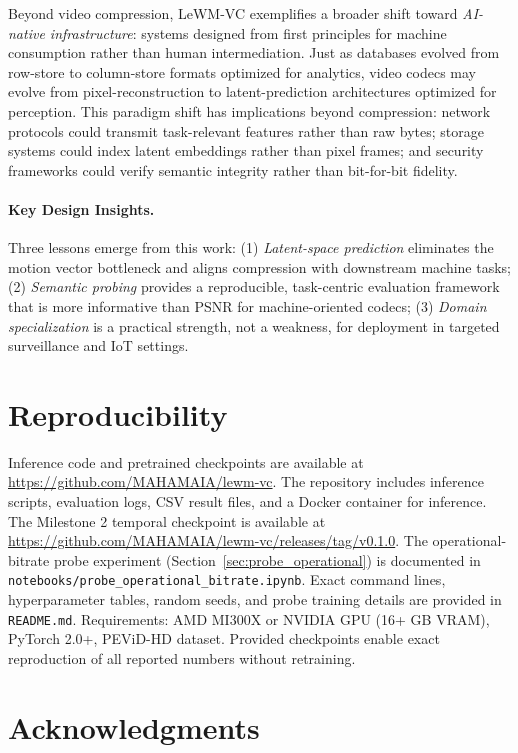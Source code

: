 \documentclass{article}
\begin{document}
Beyond video compression, LeWM-VC exemplifies a broader shift toward \textit{AI-native infrastructure}: systems designed from first principles for machine consumption rather than human intermediation. Just as databases evolved from row-store to column-store formats optimized for analytics, video codecs may evolve from pixel-reconstruction to latent-prediction architectures optimized for perception. This paradigm shift has implications beyond compression: network protocols could transmit task-relevant features rather than raw bytes; storage systems could index latent embeddings rather than pixel frames; and security frameworks could verify semantic integrity rather than bit-for-bit fidelity.

\paragraph{Key Design Insights.} Three lessons emerge from this work: (1) \textit{Latent-space prediction} eliminates the motion vector bottleneck and aligns compression with downstream machine tasks; (2) \textit{Semantic probing} provides a reproducible, task-centric evaluation framework that is more informative than PSNR for machine-oriented codecs; (3) \textit{Domain specialization} is a practical strength, not a weakness, for deployment in targeted surveillance and IoT settings.

\section*{Reproducibility}

Inference code and pretrained checkpoints are available at \url{https://github.com/MAHAMAIA/lewm-vc}. The repository includes inference scripts, evaluation logs, CSV result files, and a Docker container for inference. The Milestone 2 temporal checkpoint is available at \url{https://github.com/MAHAMAIA/lewm-vc/releases/tag/v0.1.0}. The operational-bitrate probe experiment (Section~\ref{sec:probe_operational}) is documented in \texttt{notebooks/probe\_operational\_bitrate.ipynb}. Exact command lines, hyperparameter tables, random seeds, and probe training details are provided in \texttt{README.md}. Requirements: AMD MI300X or NVIDIA GPU (16+ GB VRAM), PyTorch 2.0+, PEViD-HD dataset. Provided checkpoints enable exact reproduction of all reported numbers without retraining.

\section*{Acknowledgments}
\end{document}
